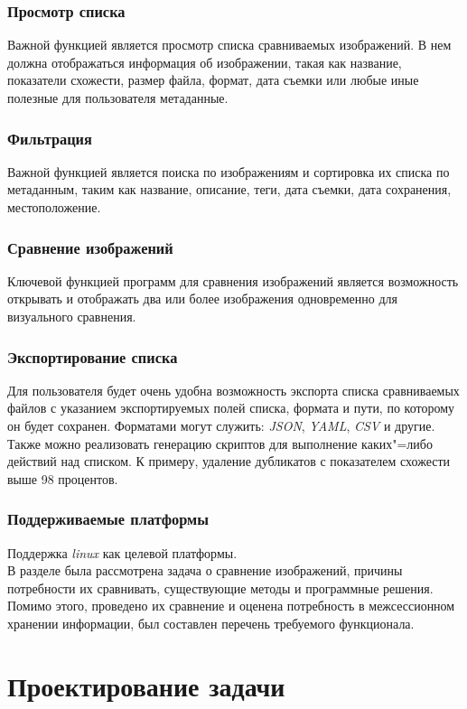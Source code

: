 \documentclass[variant=courcework]{bsuir}
\begin{document}
\subsection{Просмотр списка}
Важной функцией является просмотр списка сравниваемых изображений. В нем должна
отображаться информация об изображении, такая как название, показатели схожести,
размер файла, формат, дата съемки или любые иные полезные для пользователя
метаданные.

\subsection{Фильтрация}
Важной функцией является поиска по изображениям и сортировка их списка по
метаданным, таким как название, описание, теги, дата съемки, дата сохранения,
местоположение.

\subsection{Сравнение изображений}
Ключевой функцией программ для сравнения изображений является возможность
открывать и отображать два или более изображения одновременно для визуального
сравнения.

\subsection{Экспортирование списка}
Для пользователя будет очень удобна возможность экспорта списка сравниваемых
файлов с указанием экспортируемых полей списка, формата и пути, по которому он
будет сохранен. Форматами могут служить: \textit{JSON}, \textit{YAML},
\textit{CSV} и другие. Также можно реализовать генерацию скриптов для выполнение
каких"=либо действий над списком. К примеру, удаление дубликатов с показателем
схожести выше 98 процентов.

\subsection{Поддерживаемые платформы}
Поддержка \textit{linux} как целевой платформы.\\

В разделе была рассмотрена задача о сравнение изображений, причины потребности
их сравнивать, существующие методы и программные решения. Помимо этого,
проведено их сравнение и оценена потребность в межсессионном хранении
информации, был составлен перечень требуемого функционала.

\chapter{Проектирование задачи}
\end{document}
